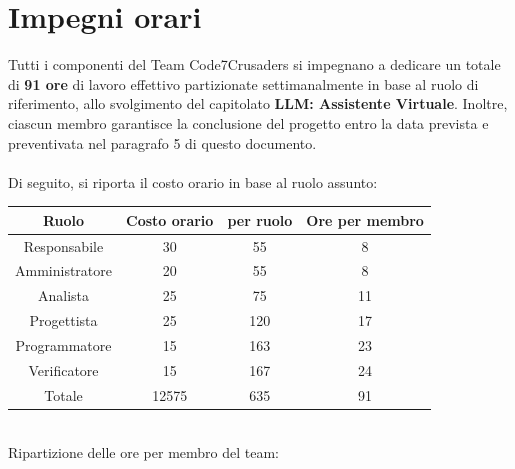\documentclass{article}
\begin{document}
\section{Impegni orari}
\label{sec:introduzione}
Tutti i componenti del Team Code7Crusaders si impegnano a dedicare un totale di \textbf{91 ore} di lavoro effettivo partizionate 
settimanalmente in base al ruolo di riferimento, allo svolgimento del capitolato \textbf{LLM: Assistente Virtuale}. Inoltre, ciascun membro garantisce la conclusione del progetto entro la 
data prevista e preventivata nel paragrafo 5 di questo documento.
\\
\\
Di seguito, si riporta il costo orario in base al ruolo assunto:
\begin{table}[!h]
	\begin{center}
		\begin{tabular}{ |c|c|c|c| }
			\hline
			Ruolo          & Costo orario &  per ruolo & Ore per membro \\
			\hline
			Responsabile   & 30           &     55       &       8        \\
			Amministratore & 20           &     55       &       8        \\
			Analista       & 25           &     75       &       11       \\
			Progettista    & 25           &     120      &       17       \\
			Programmatore  & 15           &     163      &       23       \\
			Verificatore   & 15           &     167      &       24       \\
			\hline
			Totale         &    12575    &     635       &       91       \\
			\hline
		\end{tabular}
	\end{center}
\end{table}
\\
Ripartizione delle ore per membro del team:
\end{document}
